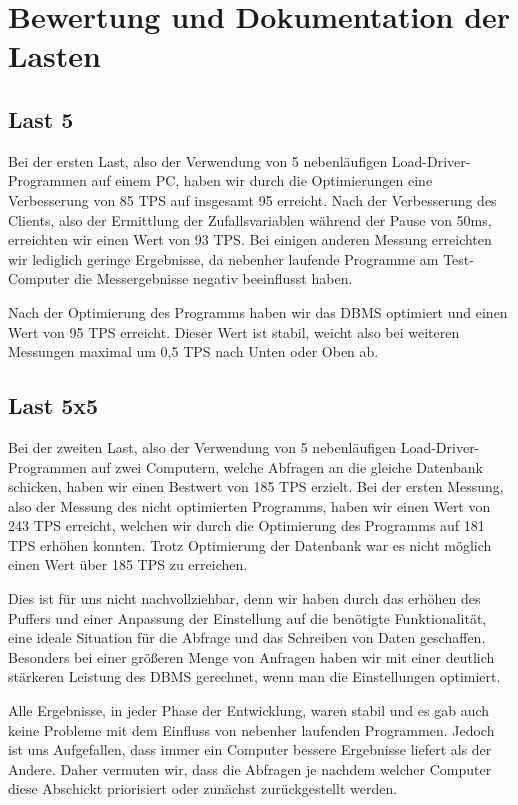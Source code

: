 \section{Bewertung und Dokumentation der Lasten}

\subsection{Last 5}
Bei der ersten Last, also der Verwendung von 5 nebenläufigen
Load-Driver-Programmen auf einem PC, haben wir durch die Optimierungen eine
Verbesserung von 85 TPS auf insgesamt 95 erreicht. Nach der Verbesserung des
Clients, also der Ermittlung der Zufallsvariablen während der Pause von 50ms,
erreichten wir einen Wert von 93 TPS. Bei einigen anderen Messung erreichten
wir lediglich geringe Ergebnisse, da nebenher laufende Programme am
Test-Computer die Messergebnisse negativ beeinflusst haben.

Nach der Optimierung des Programms haben wir das DBMS optimiert und einen Wert
von 95 TPS erreicht. Dieser Wert ist stabil, weicht also bei weiteren Messungen
maximal um 0,5 TPS nach Unten oder Oben ab.


\subsection{Last 5x5}
Bei der zweiten Last, also der Verwendung von 5 nebenläufigen
Load-Driver-Programmen auf zwei Computern, welche Abfragen an die gleiche
Datenbank schicken, haben wir einen Bestwert von 185 TPS erzielt. Bei der
ersten Messung, also der Messung des nicht optimierten Programms, haben wir
einen Wert von 243 TPS erreicht, welchen wir durch die Optimierung des
Programms auf 181 TPS erhöhen konnten. Trotz Optimierung der Datenbank war es
nicht möglich einen Wert über 185 TPS zu erreichen.

Dies ist für uns nicht nachvollziehbar, denn wir haben durch das erhöhen des
Puffers und einer Anpassung der Einstellung auf die benötigte Funktionalität,
eine ideale Situation für die Abfrage und das Schreiben von Daten geschaffen.
Besonders bei einer größeren Menge von Anfragen haben wir mit einer deutlich
stärkeren Leistung des DBMS gerechnet, wenn man die Einstellungen optimiert.

Alle Ergebnisse, in jeder Phase der Entwicklung, waren stabil und es gab auch
keine Probleme mit dem Einfluss von nebenher laufenden Programmen. Jedoch ist
uns Aufgefallen, dass immer ein Computer bessere Ergebnisse liefert als der
Andere. Daher vermuten wir, dass die Abfragen je nachdem welcher Computer diese
Abschickt priorisiert oder zunächst zurückgestellt werden.

